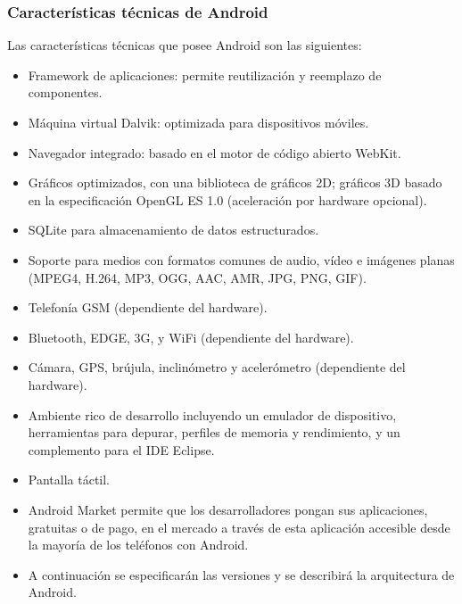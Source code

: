 \documentclass[12 pt, a4paper, twoside]{article}
\begin{document}
\subsubsection{Características técnicas de Android}
Las características técnicas que posee Android son las siguientes:
\begin{itemize}
\item Framework de aplicaciones: permite reutilización y reemplazo de
  componentes.
\item Máquina virtual Dalvik: optimizada para dispositivos móviles.
\item Navegador integrado: basado en el motor de código abierto
  WebKit.
\item Gráficos optimizados, con una biblioteca de gráficos 2D; gráficos 3D basado
en la especificación OpenGL ES 1.0 (aceleración por hardware
opcional).
\item SQLite para almacenamiento de datos estructurados.
\item Soporte para medios con formatos comunes de audio, vídeo e imágenes
planas (MPEG4, H.264, MP3, OGG, AAC, AMR, JPG, PNG, GIF).
\item Telefonía GSM (dependiente del hardware).
\item Bluetooth, EDGE, 3G, y WiFi (dependiente del hardware).
\item Cámara, GPS, brújula, inclinómetro y acelerómetro (dependiente del
hardware).
\item Ambiente rico de desarrollo incluyendo un emulador de dispositivo, herramientas
para depurar, perfiles de memoria y rendimiento, y un complemento
para el IDE Eclipse.
\item Pantalla táctil.
\item Android Market permite que los desarrolladores pongan sus aplicaciones,
gratuitas o de pago, en el mercado a través de esta aplicación accesible desde
la mayoría de los teléfonos con Android.
\item A continuación se especificarán las versiones y se describirá la arquitectura de
Android.
\end{itemize}

\end{document}
